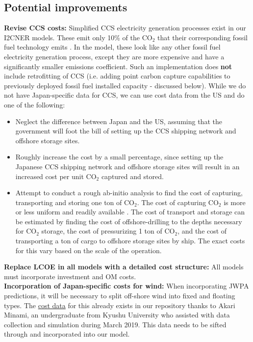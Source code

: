 \documentclass[14pt,a4paper]{article} %
\begin{document}
\subsection{Potential improvements}

\textbf{Revise \gls{CCS} costs:} Simplified \gls{CCS} electricity generation processes exist in our \gls{I2CNER} models. These emit only 10\% of the CO$_2$ that their corresponding fossil fuel technology emits \cite{kato_energy_2016}. In the model, these look like any other fossil fuel electricity generation process, except they are more expensive and have a significantly smaller emissions coefficient. Such an implementation does \textbf{not} include retrofitting of \gls{CCS} (i.e. adding point carbon capture capabilities to previously deployed fossil fuel installed  capacity - discussed below). While we do not have Japan-specific data for \gls{CCS}, we can use cost data from the US and do one of the following:

\begin{itemize}

\item Neglect the difference between Japan and the US, assuming that the government will foot the bill of setting up the \gls{CCS} shipping network and offshore storage sites.

\item Roughly increase the cost by a small percentage, since setting up the Japanese \gls{CCS} shipping network and offshore storage sites will result in an increased cost per unit CO$_2$ captured and stored.

\item Attempt to conduct a rough ab-initio analysis to find the cost of capturing, transporting and storing one ton of CO$_2$. The cost of capturing CO$_2$ is more or less uniform and readily available \cite{kato_energy_2016}. The cost of transport and storage can be estimated by finding the cost of offshore-drilling to the depths necessary for CO$_2$ storage, the cost of pressurizing 1 ton of CO$_2$, and the cost of transporting a ton of cargo to offshore storage sites by ship. The exact costs for this vary based on the scale of the operation.

\end{itemize}

\textbf{Replace \gls{LCOE} in all models with a detailed cost structure:} All models must incorporate investment and \gls{OM} costs.\\

\textbf{Incorporation of Japan-specific costs for wind:} When incorporating \gls{JWPA} predictions, it will be necessary to split off-shore wind into fixed and floating types. The \href{https://github.com/arfc/i2cner/tree/master/data/japan_costs}{cost data} for this already exists in our repository thanks to Akari Minami, an undergraduate from Kyushu University who assisted with data collection and simulation during March 2019. This data needs to be sifted through and incorporated into our model.\\
\end{document}
